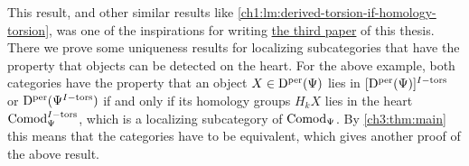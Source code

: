 \begin{addendum}
    This result, and other similar results like \cref{ch1:lm:derived-torsion-if-homology-torsion}, was one of the inspirations for writing \hyperref[ch3]{the third paper} of this thesis. There we prove some uniqueness results for localizing subcategories that have the property that objects can be detected on the heart. For the above example, both categories have the property that an object $X\in \mathrm{D}^{\mathrm{per}}(\Psi)$ lies in $[\mathrm{D}^{\mathrm{per}}(\Psi)]^{I-\mathrm{tors}}$ or $\mathrm{D}^{\mathrm{per}}(\Psi^{I-\mathrm{tors}})$ if and only if its homology groups $H_k X$ lies in the heart $\mathrm{Comod}_\Psi^{I-\mathrm{tors}}$, which is a localizing subcategory of $\mathrm{Comod}_\Psi$. By \cref{ch3:thm:main} this means that the categories have to be equivalent, which gives another proof of the above result. 
\end{addendum}




